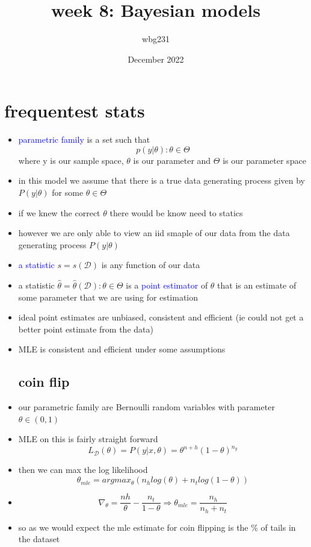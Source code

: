 \documentclass{article}
\title{week 8: Bayesian models}
\author{wbg231 }
\date{December 2022}
\begin{document}
\maketitle

\section{frequentest stats}
\begin{itemize}
\item \textcolor{blue}{parametric family} is a set such that $$p(y|\theta):\theta\in \Theta$$ where y is our sample space, $\theta$ is our parameter and $\Theta$ is our parameter space 
\item in this model we assume that there is a true data generating process given by $P(y|\theta)$ for some $\theta\in \Theta$
\item if we knew the correct $\theta$ there would be know need to statics
\item however we are only able to view an iid smaple of our data from the data generating process $P(y|\theta)$
\item \textcolor{blue}{a statistic} $s=s(\mathcal{D})$ is any function of our data 
\item a statistic $\hat{\theta}=\hat{\theta}(\mathcal{D}):\theta\in \Theta$ is a \textcolor{blue}{point estimator} of $\theta$ that is an estimate of some parameter that we are using for estimation
\item ideal point estimates are unbiased, consistent and efficient (ie could not get a better point estimate from the data)
\item MLE is consistent and efficient under some assumptions 
\subsection*{coin flip}
\item our parametric family are Bernoulli random variables with parameter $\theta\in (0,1)$
\item MLE on this is fairly straight forward $$L_{\mathcal{D}}(\theta)=P(y|x,\theta)=\theta^{n+h}(1-\theta)^{n_y}$$
\item then we can max the log likelihood $$\theta_{mle}=argmax_{\theta}(n_hlog(\theta)+n_tlog(1-\theta))$$
\item $$\nabla_{\theta}=\frac{nh}{\theta}-\frac{n_t}{1-\theta}\Rightarrow \theta_{mle}=\frac{n_h}{n_h+n_t}$$
\item so as we would expect the mle estimate for coin flipping is the \% of tails in the dataset 

\end{itemize}
\end{document}
